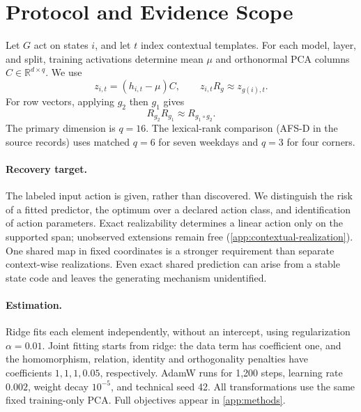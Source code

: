 \documentclass[10pt]{article}
\newcommand{\R}{\mathbb{R}}
\begin{document}
\section{Protocol and Evidence Scope}
\label{sec:setup}
Let $G$ act on states $i$, and let $t$ index contextual templates. For each model, layer, and split, training activations determine mean $\mu$ and orthonormal PCA columns $C\in\R^{d\times q}$. We use
\begin{equation}
 z_{i,t}=(h_{i,t}-\mu)C,\qquad z_{i,t}R_g\approx z_{g(i),t}.
\end{equation}
For row vectors, applying $g_2$ then $g_1$ gives
\begin{equation}
 R_{g_2}R_{g_1}\approx R_{g_1\circ g_2}.
 \label{eq:convention}
\end{equation}
The primary dimension is $q=16$. The lexical-rank comparison (AFS-D in the source records) uses matched $q=6$ for seven weekdays and $q=3$ for four corners.

\paragraph{Recovery target.}
The labeled input action is given, rather than discovered. We distinguish the risk of a fitted predictor, the optimum over a declared action class, and identification of action parameters. Exact realizability determines a linear action only on the supported span; unobserved extensions remain free (\cref{app:contextual-realization}). One shared map in fixed coordinates is a stronger requirement than separate context-wise realizations. Even exact shared prediction can arise from a stable state code and leaves the generating mechanism unidentified.

\paragraph{Estimation.}
Ridge fits each element independently, without an intercept, using regularization $\alpha=0.01$. Joint fitting starts from ridge: the data term has coefficient one, and the homomorphism, relation, identity and orthogonality penalties have coefficients $1,1,1,0.05$, respectively. AdamW runs for 1,200 steps, learning rate $0.002$, weight decay $10^{-5}$, and technical seed 42. All transformations use the same fixed training-only PCA. Full objectives appear in \cref{app:methods}.
\end{document}
